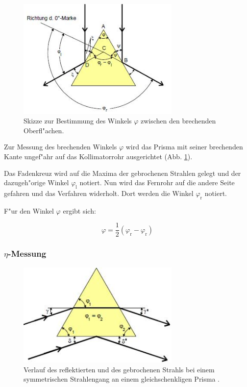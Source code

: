 	\begin{figure}[!h]
		\centering
		\includegraphics[width = 8cm]{img/phi.JPG}
		\caption{Skizze zur Bestimmung des Winkels $\varphi$ zwischen den brechenden Oberfl"achen. \cite{anleitung}}
		\label{fg:phi}
	\end{figure}

	Zur Messung des brechenden Winkels $\varphi$ wird das Prisma mit seiner brechenden Kante ungef"ahr auf das Kollimatorrohr ausgerichtet (Abb. \ref{fg:phi}).

	Das Fadenkreuz wird auf die Maxima der gebrochenen Strahlen gelegt und der dazugeh"orige Winkel $\varphi_\mathrm{l}$ notiert. Nun wird das Fernrohr auf die andere Seite gefahren und das Verfahren widerholt. Dort werden die Winkel $\varphi_\mathrm{r}$ notiert.

	F"ur den Winkel $\varphi$ ergibt sich:

	\begin{equation}
		\varphi = \frac{1}{2} ( \varphi_\mathrm{r} - \varphi_\mathrm{r} ) \label{eqn:phi}
	\end{equation}

	\subsubsection{$\eta$-Messung} %
	\label{sub:subsection_name}
	
	\begin{figure}[!h]
		\centering
		\includegraphics[width = 8cm]{img/eta.JPG}
		\caption{Verlauf des reflektierten und des gebrochenen Strahls bei einem symmetrischen Strahlengang an einem gleichschenkligen Prisma \cite{anleitung}.}
		\label{fg:eta}
	\end{figure}

